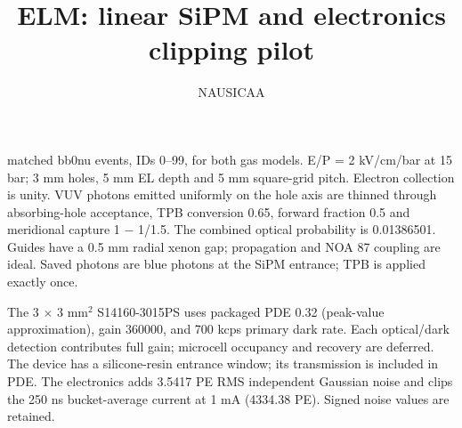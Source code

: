 \documentclass[11pt,a4paper]{article}
\begin{document}
\title{ELM: linear SiPM and electronics clipping pilot}\author{NAUSICAA}\date{} matched bb0nu events, IDs 0--99, for both gas models. E/P = 2 kV/cm/bar at 15 bar; 3 mm holes, 5 mm EL depth and 5 mm square-grid pitch. Electron collection is unity. VUV photons emitted uniformly on the hole axis are thinned through absorbing-hole acceptance, TPB conversion 0.65, forward fraction 0.5 and meridional capture 1 $-$ 1/1.5. The combined optical probability is 0.01386501. Guides have a 0.5 mm radial xenon gap; propagation and NOA 87 coupling are ideal. Saved photons are blue photons at the SiPM entrance; TPB is applied exactly once.

The 3 $\times$ 3 mm$^2$ S14160-3015PS uses packaged PDE 0.32 (peak-value approximation), gain 360000, and 700 kcps primary dark rate. Each optical/dark detection contributes full gain; microcell occupancy and recovery are deferred. The device has a silicone-resin entrance window; its transmission is included in PDE. The electronics adds 3.5417 PE RMS independent Gaussian noise and clips the 250 ns bucket-average current at 1 mA (4334.38 PE). Signed noise values are retained.

\begin{center}\end{center}
\begin{center}\end{center}
\end{document}
